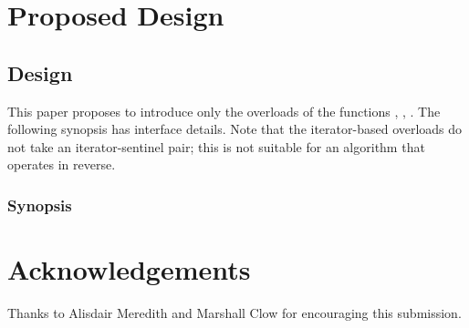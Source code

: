 \section{Proposed Design}

\subsection{Design}

This paper proposes to introduce only the  overloads of the
functions , ,
.  The following synopsis has interface details.
Note that the iterator-based overloads do not take an iterator-sentinel pair;
this is not suitable for an algorithm that operates in reverse.

\subsubsection{ Synopsis}




\section{Acknowledgements}

Thanks to Alisdair Meredith and Marshall Clow for encouraging this submission.
